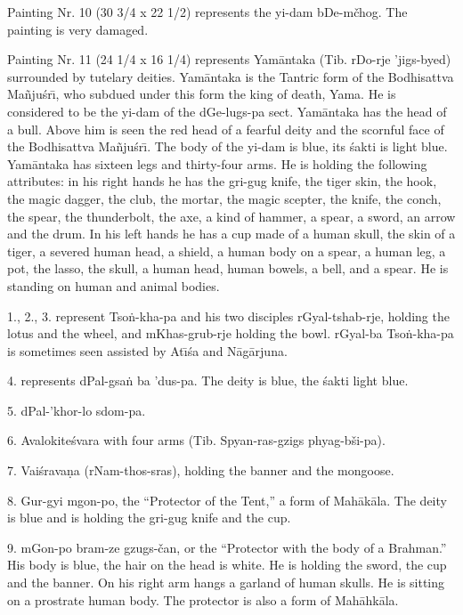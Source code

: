 \documentclass[a4paper, 12pt, oneside]{article}
\begin{document}
\bigskip

Painting Nr. 10 (30 3/4 x 22 1/2) represents the yi-dam bDe-mčhog. The painting is very damaged.

\bigskip

Painting Nr. 11 (24 1/4 x 16 1/4) represents Yam\={a}ntaka (Tib. rDo-rje 'jigs-byed) surrounded by tutelary deities. Yam\={a}ntaka is the Tantric form of the Bodhisattva Ma\~{n}ju\'{s}r\={\i}, who subdued under this form the king of death, Yama. He is considered to be the yi-dam of the dGe-lugs-pa sect. Yam\={a}ntaka has the head of a bull. Above him is seen the red head of a fearful deity and the scornful face of the Bodhisattva Ma\~{n}ju\'{s}r\={\i}. The body of the yi-dam is blue, its \'{s}akti is light blue. Yam\={a}ntaka has sixteen legs and thirty-four arms. He is holding the following attributes: in his right hands he has the gri-gug knife, the tiger skin, the hook, the magic dagger, the club, the mortar, the magic scepter, the knife, the conch, the spear, the thunderbolt, the axe, a kind of hammer, a spear, a sword, an arrow and the drum. In his left hands he has a cup made of a human skull, the skin of a tiger, a severed human head, a shield, a human body on a spear, a human leg, a pot, the lasso, the skull, a human head, human bowels, a bell, and a spear. He is standing on human and animal bodies.

1., 2., 3. represent Tso\.{n}-kha-pa and his two disciples rGyal-tshab-rje, holding the lotus and the wheel, and mKhas-grub-rje holding the bowl. rGyal-ba Tso\.{n}-kha-pa is sometimes seen assisted by At\={\i}\'{s}a and N\={a}g\={a}rjuna.

4. represents dPal-gsa\.{n} ba 'dus-pa. The deity is blue, the \'{s}akti light blue.

5. dPal-'khor-lo sdom-pa.

6. Avalokite\'{s}vara with four arms (Tib. Spyan-ras-gzigs phyag-bši-pa).

7. Vai\'{s}rava\d{n}a (rNam-thos-sras), holding the banner and the mongoose.

8. Gur-gyi mgon-po, the ``Protector of the Tent,'' a form of Mah\={a}k\={a}la. The deity is blue and is holding the gri-gug knife and the cup.

9. mGon-po bram-ze gzugs-čan, or the ``Protector with the body of a Brahman.'' His body is blue, the hair on the head is white. He is holding the sword, the cup and the banner. On his right arm hangs a garland of human skulls. He is sitting on a prostrate human body. The protector is also a form of Mah\={a}hk\={a}la.
\end{document}

